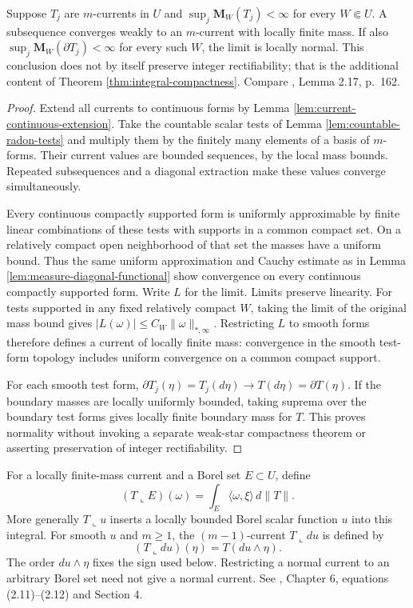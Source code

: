 \begin{proposition}\label{prop:current-weak-compactness}
Suppose $T_j$ are $m$-currents in $U$ and $\sup_j\mathbf M_W(T_j)<\infty$ for every $W\Subset U$. A subsequence converges weakly to an $m$-current with locally finite mass. If also $\sup_j\mathbf M_W(\partial T_j)<\infty$ for every such $W$, the limit is locally normal. This conclusion does not by itself preserve integer rectifiability; that is the additional content of Theorem \ref{thm:integral-compactness}. Compare \cite{Sim18}, Lemma 2.17, p.~162.
\end{proposition}
\begin{proof}
Extend all currents to continuous forms by Lemma \ref{lem:current-continuous-extension}. Take the countable scalar tests of Lemma \ref{lem:countable-radon-tests} and multiply them by the finitely many elements of a basis of $m$-forms. Their current values are bounded sequences, by the local mass bounds. Repeated subsequences and a diagonal extraction make these values converge simultaneously.

Every continuous compactly supported form is uniformly approximable by finite linear combinations of these tests with supports in a common compact set. On a relatively compact open neighborhood of that set the masses have a uniform bound. Thus the same uniform approximation and Cauchy estimate as in Lemma \ref{lem:measure-diagonal-functional} show convergence on every continuous compactly supported form. Write $L$ for the limit. Limits preserve linearity. For tests supported in any fixed relatively compact $W$, taking the limit of the original mass bound gives $|L(\omega)|\leq C_W\|\omega\|_{*,\infty}$. Restricting $L$ to smooth forms therefore defines a current of locally finite mass: convergence in the smooth test-form topology includes uniform convergence on a common compact support.

For each smooth test form, $\partial T_j(\eta)=T_j(d\eta)\to T(d\eta)=\partial T(\eta)$. If the boundary masses are locally uniformly bounded, taking suprema over the boundary test forms gives locally finite boundary mass for $T$. This proves normality without invoking a separate weak-star compactness theorem or asserting preservation of integer rectifiability.
\end{proof}

\begin{definition}\label{def:current-restriction}
For a locally finite-mass current and a Borel set $E\subset U$, define
\[
 (T\llcorner E)(\omega)=\int_E\langle\omega,\xi\rangle\,d\|T\|.
\]
More generally $T\llcorner u$ inserts a locally bounded Borel scalar function $u$ into this integral. For smooth $u$ and $m\geq1$, the $(m-1)$-current $T\llcorner du$ is defined by
\[
 (T\llcorner du)(\eta)=T(du\wedge\eta).
\]
The order $du\wedge\eta$ fixes the sign used below. Restricting a normal current to an arbitrary Borel set need not give a normal current. See \cite{Sim18}, Chapter 6, equations (2.11)--(2.12) and Section 4.
\end{definition}

